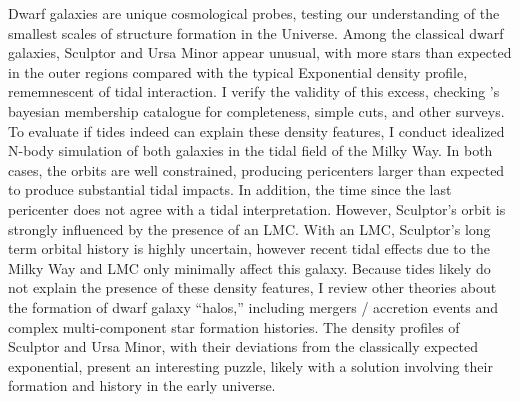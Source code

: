 Dwarf galaxies are unique cosmological probes, testing our understanding
of the smallest scales of structure formation in the Universe. Among the
classical dwarf galaxies, Sculptor and Ursa Minor appear unusual, with
more stars than expected in the outer regions compared with the typical
Exponential density profile, rememnescent of tidal interaction. I verify
the validity of this excess, checking \citet{jensen+2024}'s bayesian
membership catalogue for completeness, simple cuts, and other surveys.
To evaluate if tides indeed can explain these density features, I
conduct idealized N-body simulation of both galaxies in the tidal field
of the Milky Way. In both cases, the orbits are well constrained,
producing pericenters larger than expected to produce substantial tidal
impacts. In addition, the time since the last pericenter does not agree
with a tidal interpretation. However, Sculptor's orbit is strongly
influenced by the presence of an LMC. With an LMC, Sculptor's long term
orbital history is highly uncertain, however recent tidal effects due to
the Milky Way and LMC only minimally affect this galaxy. Because tides
likely do not explain the presence of these density features, I review
other theories about the formation of dwarf galaxy ``halos,'' including
mergers / accretion events and complex multi-component star formation
histories. The density profiles of Sculptor and Ursa Minor, with their
deviations from the classically expected exponential, present an
interesting puzzle, likely with a solution involving their formation and
history in the early universe.
